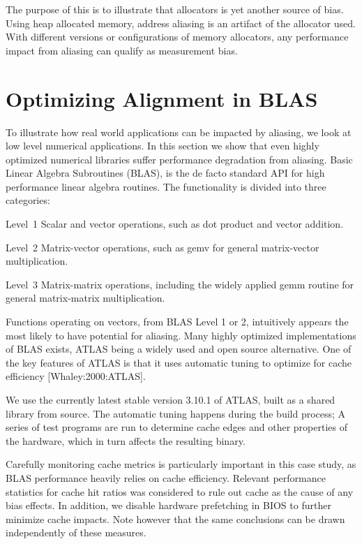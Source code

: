 \documentclass[a4paper,10pt,twocolumn,twoside]{article}
\begin{document}
The purpose of this is to illustrate that allocators is yet another source of bias.
Using heap allocated memory, address aliasing is an artifact of the allocator used.
With different versions or configurations of memory allocators, any performance impact from aliasing can qualify as measurement bias.


\section{Optimizing Alignment in BLAS}

To illustrate how real world applications can be impacted by aliasing, we look at low level numerical applications.
In this section we show that even highly optimized numerical libraries suffer performance degradation from aliasing.
Basic Linear Algebra Subroutines (BLAS), is the de facto standard API for high performance linear algebra routines.
The functionality is divided into three categories: 

\begin{description}
  \item{Level~1} Scalar and vector operations, such as dot product and vector addition.
  \item{Level~2} Matrix-vector operations, such as gemv for general matrix-vector multiplication.
  \item{Level~3} Matrix-matrix operations, including the widely applied gemm routine for general matrix-matrix multiplication. 
\end{description}

Functions operating on vectors, from BLAS Level 1 or 2, intuitively appears the most likely to have potential for aliasing.
Many highly optimized implementations of BLAS exists, ATLAS being a widely used and open source alternative. One of the key features of ATLAS is that it uses automatic tuning to optimize for cache efficiency [Whaley:2000:ATLAS]. 

We use the currently latest stable version 3.10.1 of ATLAS, built as a shared library from source.
The automatic tuning happens during the build process; A series of test programs are run to determine cache edges and other properties of the hardware, which in turn affects the resulting binary. 

Carefully monitoring cache metrics is particularly important in this case study, as BLAS performance heavily relies on cache efficiency.
Relevant performance statistics for cache hit ratios was considered to rule out cache as the cause of any bias effects.
In addition, we disable hardware prefetching in BIOS to further minimize cache impacts. 
Note however that the same conclusions can be drawn independently of these measures.
\end{document}
